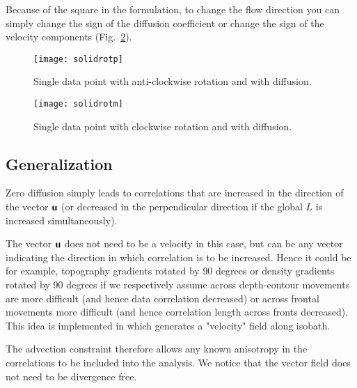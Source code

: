 Because of the square in the formulation, to change the flow direction 
you can simply change the sign of the diffusion coefficient or change 
the sign of the velocity components (Fig.~\ref{fig:solidrotm}).

\begin{figure}[htpb]
\parbox{.6\textwidth}{
\texttt{[image: solidrotp]}
}\parbox{.4\textwidth}{
\caption{Single data point with anti-clockwise rotation and with diffusion. \label{fig:solidrotp}}
}
\end{figure}

\begin{figure}[htpb]
\centering
\parbox{.6\textwidth}{
\texttt{[image: solidrotm]}
}\parbox{.4\textwidth}{
\caption{Single data point with clockwise rotation and with diffusion. \label{fig:solidrotm}}
}
\end{figure}


\subsection{Generalization}

Zero diffusion simply leads to correlations that are increased in the 
direction of the vector $\mbox{\boldmath $ \protect\mathsf{u} $}$ (or decreased in the perpendicular 
direction if the global $L$ is increased simultaneously). 

The vector $\mbox{\boldmath $ \protect\mathsf{u} $}$ does not need to be a velocity in this case, but can be any 
vector indicating the direction in which correlation is to be increased.
Hence it could be for example, topography gradients rotated by $90$ degrees 
or density gradients rotated by 90 degrees if we respectively assume across depth-contour movements are more 
difficult (and hence data correlation decreased) or across frontal movements more difficult (and hence correlation length 
across fronts decreased). This idea is implemented in  which generates a "velocity" field along isobath.

The advection constraint therefore allows any known anisotropy in the correlations to be included into the analysis. We notice that the vector field does not need to be divergence free.



